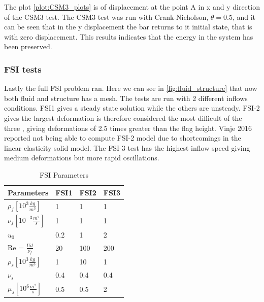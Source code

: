 The plot \ref{plot:CSM3_plots} is of displacement at the point A in x and y direction of the CSM3 test. The CSM3 test was run with Crank-Nicholson, $\theta = 0.5$, and it can be seen that in the y displacement the bar returns to it initial state, that is with zero displacement. This results indicates that the energy in the system has been preserved.

\subsubsection*{FSI tests}
Lastly the full FSI problem ran. Here we can see in \ref{fig:fluid_structure} that now both fluid and structure has a mesh. The tests are run with 2 different inflows conditions. FSI1 gives a steady state solution while the others are unsteady. FSI-2 gives the largest deformation is therefore considered the most difficult of the three \cite{Richter2013}, giving deformations of 2.5 times greater than the flag height. Vinje 2016 \cite{Vinje2016} reported not being able to compute FSI-2 model due to shortcomings in the linear elasticity solid model. The FSI-3 test has the highest inflow speed giving medium deformations but more rapid oscillations.


\begin{table}[h!]
\centering
\caption{FSI Parameters}
\label{my-label}
\begin{tabular}{|l|l|l|l|}
\hline
Parameters & FSI1 & FSI2 & FSI3 \\ \hline
$\rho_f[10^3 \frac{kg}{m^3}]$ & 1 & 1 & 1 \\ \hline
$\nu_f [10^{-3} \frac{m^2}{s}]$ & 1 & 1 & 1 \\ \hline
$u_0$ & 0.2 & 1 & 2 \\ \hline
Re = $\frac{U d}{\nu_f}$ & 20 & 100 & 200 \\ \hline
$\rho_s[10^3 \frac{kg}{m^3}]$ & 1 & 10 & 1 \\ \hline
$\nu_s$ & 0.4 & 0.4 & 0.4 \\ \hline
$\mu_s[10^6 \frac{m^2}{s}]$ & 0.5 & 0.5 & 2 \\ \hline
\end{tabular}
\end{table}

